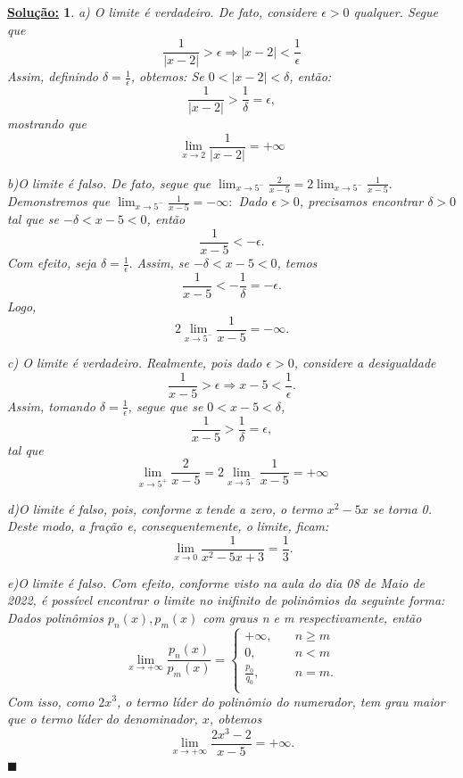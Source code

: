 \documentclass{article}
\newtheorem*{sol*}{\underline{Solu\c c\~ao:}}
\renewcommand\qedsymbol{$\blacksquare$}
\begin{document}
\begin{sol*}
	a) O limite \'e verdadeiro. De fato, considere $\epsilon > 0$ qualquer. Segue que
	$$
		\frac{1}{|x - 2|} > \epsilon \Rightarrow |x - 2| < \frac{1}{\epsilon}
	$$
	Assim, definindo $\delta = \frac{1}{\epsilon}$, obtemos: Se $0 < |x - 2| < \delta$, ent\~ao:
	$$
		\frac{1}{|x - 2|} > \frac{1}{\delta} = \epsilon,
	$$
	mostrando que
	$$
		\lim_{x\to2}\frac{1}{|x - 2|}=+\infty
	$$

	b)O limite \'e falso. De fato, segue que  $\lim_{x\to5^-}\frac{2}{x - 5} = 2\lim_{x\to5^-}\frac{1}{x - 5}.$ Demonstremos que $\lim_{x\to5^-}\frac{1}{x - 5} = -\infty:$ Dado $\epsilon > 0$, precisamos encontrar $\delta > 0$ tal que se $-\delta < x - 5< 0$, ent\~ao
	$$
		\frac{1}{x - 5} < -\epsilon.
	$$
	Com efeito, seja $\delta = \frac{1}{\epsilon}.$ Assim, se $-\delta < x - 5< 0$, temos
	$$
		\frac{1}{x - 5} < -\frac{1}{\delta} = -\epsilon.
	$$
	Logo,
	$$
		2\lim_{x\to5^-}\frac{1}{x - 5} = -\infty.
	$$

	c) O limite \'e verdadeiro. Realmente, pois dado $\epsilon > 0$, considere a desigualdade
	$$
		\frac{1}{x - 5} > \epsilon \Rightarrow x - 5 < \frac{1}{\epsilon}.
	$$
	Assim, tomando $\delta = \frac{1}{\epsilon}$, segue que se $0 < x - 5 < \delta$,
	$$
		\frac{1}{x - 5} > \frac{1}{\delta} = \epsilon,
	$$
	tal que
	$$
		\lim_{x\to5^+}\frac{2}{x - 5} = 2\lim_{x\to5^-}\frac{1}{x - 5} = +\infty
	$$

	d)O limite \'e falso, pois, conforme x tende a zero, o termo $x^2 - 5x$ se torna 0. Deste modo, a fra\c c\~ao e, consequentemente, o limite, ficam:
	$$
		\lim_{x\to0}\frac{1}{x^2 - 5x + 3} = \frac{1}{3}.
	$$

	e)O limite \'e falso. Com efeito, conforme visto na aula do dia 08 de Maio de 2022, \'e poss\'ivel encontrar o limite no inifinito de polin\^omios da seguinte forma: Dados polin\^omios $p_n(x), p_m(x)$ com graus n e m respectivamente, ent\~ao
	$$
		\lim_{x\to+\infty}\frac{p_n(x)}{p_m(x)} =
		\left\{\begin{array}{ll}
			+\infty,         & \quad n\geq{m} \\
			0,               & \quad n < m    \\
			\frac{p_0}{q_0}, & \quad n = m.   \\
		\end{array}\right.
	$$
	Com isso, como $2x^3$, o termo l\'ider do polin\^omio do numerador, tem grau maior que o termo l\'ider do denominador, $x$, obtemos
	$$
		\lim_{x\to+\infty}\frac{2x^3 - 2}{x-5} = +\infty.
	$$
	\qedsymbol
\end{sol*}
\end{document}
